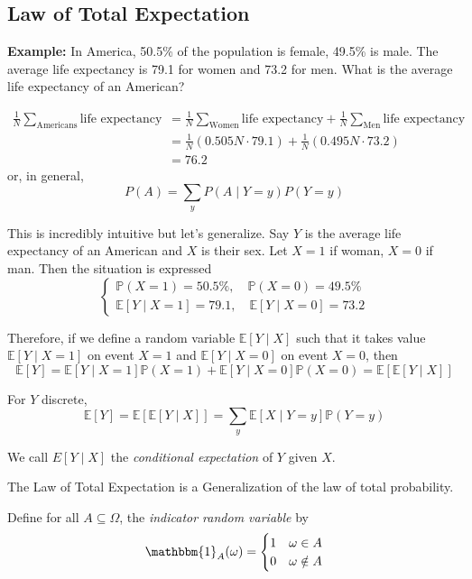 \documentclass[12pt]{report}
\renewcommand{\P}{\mathbb{P}}
\newcommand{\E}{\mathbb{E}}
\newcommand{\ind}{\mathbbm{1}}
\newcommand{\sub}{\subseteq}
\begin{document}
\subsection*{Law of Total Expectation}
    \textbf{Example:} In America, 50.5\% of the population is female, 49.5\% is male. The average life expectancy is 79.1 for women and 73.2 for men. What is the average life expectancy of an American?

    \begin{align*}
        \frac{1}{N} \sum_{\text{Americans}} \text{life expectancy} &= \frac{1}{N} \sum_{\text{Women}} \text{life expectancy} + \frac{1}{N} \sum_{\text{Men}} \text{life expectancy}\\
        &= \frac{1}{N}(0.505N \cdot 79.1) + \frac{1}{N}(0.495N \cdot 73.2)\\
        &= 76.2
    \end{align*}
    or, in general, 
    \[P(A) = \sum_y P(A \; | \; Y = y)P(Y = y)\]

    This is incredibly intuitive but let's generalize. Say $Y$ is the average life expectancy of an American and $X$ is their sex. Let $X = 1$ if woman, $X =0$ if man. 
    Then the situation is expressed 
    \[\begin{cases}
        \P(X = 1) = 50.5\%, \quad \P(X = 0) = 49.5\%\\ 
        \E[Y \; | \; X = 1] = 79.1, \quad \E[Y \; | \; X = 0] = 73.2
    \end{cases}\]  


    Therefore, if we define a random variable $\E[Y \; | \; X]$ such that it takes value $\E[Y \; | \; X = 1]$ on event $X = 1$ and $\E[Y \; | \; X = 0]$ on event $X = 0$, then
    \[\E[Y] = \E[Y \; | \; X=1] \P(X = 1) + \E[Y \; | \; X = 0] \P(X = 0) = \E[\E[Y \; | \; X]]\]
    
    For $Y$ discrete, 
    \[\E[Y] = \E[\E[Y \; | \; X]] = \sum_y \E[X \; | \; Y = y] \P(Y = y)\]

    We call $E[Y \; | \; X]$ the \emph{conditional expectation} of $Y$ given $X$. 

    The Law of Total Expectation is a Generalization of the law of total probability. 

    Define for all $A \sub \Omega$, the \emph{indicator random variable} by
    \[\ind_{A}(\omega) = \begin{cases}
        1 & \omega \in A\\
        0 & \omega \notin A
    \end{cases}\]  
\end{document}
